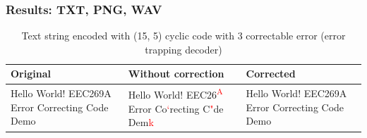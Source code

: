 \documentclass{article}
\begin{document}
\subsubsection{Results: TXT, PNG, WAV}

\begin{table}[htb]
    \centering
    \caption{Text string encoded with (15, 5) cyclic code with 3 correctable error (error trapping decoder)}
    \label{tab:text-cyclic-15-5-trapping}
    \renewcommand{\arraystretch}{1.5}
    \begin{tabulary}{\textwidth}{ |L|L|L| } 
    \hline
    \textbf{Original} & \textbf{Without correction} & \textbf{Corrected} \\
    \hline
    Hello World! EEC269A Error Correcting Code Demo & Hello World! EEC26\textcolor{red}{\textsuperscript{A}} Error Co\textcolor{red}{`}recting C\textcolor{red}{"}de Dem\textcolor{red}{k} & Hello World!
    EEC269A Error Correcting Code Demo \\
    \hline
\end{tabulary}
\end{table}
\end{document}
